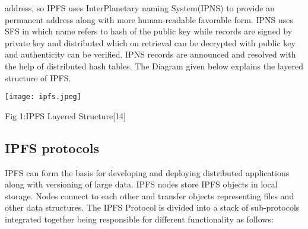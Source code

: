 \documentclass[12pt]{article}
\begin{document}
address, so IPFS uses InterPlanetary naming System(IPNS) to provide an permanent address along with more human-readable favorable form. IPNS uses SFS in which name refers to hash of the public key while records are signed by private key and distributed which on retrieval can be decrypted with public key and authenticity can be verified. IPNS records are announced and resolved with the help of distributed hash tables. The Diagram given below explains the layered structure of IPFS.

\bigskip

\texttt{[image: ipfs.jpeg]} 
\caption{Fig 1:IPFS Layered Structure[14]}

\bigskip

\subsection{IPFS protocols}
IPFS can form the basis for developing and deploying distributed applications along with versioning of large data.  IPFS nodes store IPFS objects in local storage. Nodes connect to each other and transfer objects representing files and other data structures. The IPFS Protocol is divided into a
stack of sub-protocols integrated together being responsible for different functionality as follows:
\end{document}
